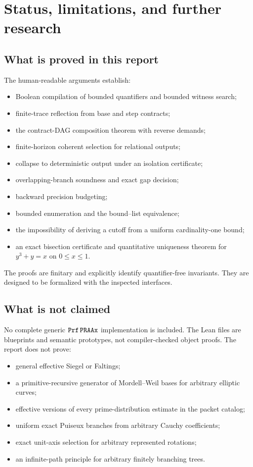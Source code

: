 \section{Status, limitations, and further research}

\subsection{What is proved in this report}

The human-readable arguments establish:
\begin{itemize}[leftmargin=1.6em]
\item Boolean compilation of bounded quantifiers and bounded witness search;
\item finite-trace reflection from base and step contracts;
\item the contract-DAG composition theorem with reverse demands;
\item finite-horizon coherent selection for relational outputs;
\item collapse to deterministic output under an isolation certificate;
\item overlapping-branch soundness and exact gap decision;
\item backward precision budgeting;
\item bounded enumeration and the bound--list equivalence;
\item the impossibility of deriving a cutoff from a uniform cardinality-one
      bound;
\item an exact bisection certificate and quantitative uniqueness theorem for
      \(y^3+y=x\) on \(0\le x\le1\).
\end{itemize}

The proofs are finitary and explicitly identify quantifier-free invariants.
They are designed to be formalized with the inspected 
interfaces.

\subsection{What is not claimed}

No complete generic \(\mathtt{Prf}\,\mathtt{PRAAx}\) implementation is included.  The Lean
files are blueprints and semantic prototypes, not compiler-checked object
proofs.  The report does not prove:
\begin{itemize}[leftmargin=1.6em]
\item general effective Siegel or Faltings;
\item a primitive-recursive generator of Mordell--Weil bases for arbitrary
      elliptic curves;
\item effective versions of every prime-distribution estimate in the packet
      catalog;
\item uniform exact Puiseux branches from arbitrary Cauchy coefficients;
\item exact unit-axis selection for arbitrary represented rotations;
\item an infinite-path principle for arbitrary finitely branching trees.
\end{itemize}


